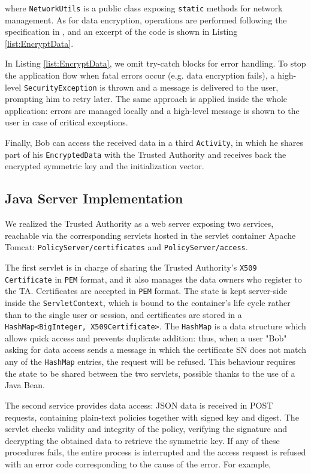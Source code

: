 \noindent where \texttt{NetworkUtils} is a public class exposing \texttt{static} methods for network management. As for data encryption, operations are performed following the specification in \cite{pearson2011sticky}, and an excerpt of the code is shown in Listing \ref{list:EncryptData}.


In Listing \ref{list:EncryptData}, we omit try-catch blocks for error handling. To stop the application flow when fatal errors occur (e.g. data encryption fails), a high-level \texttt{SecurityException} is thrown and a message is delivered to the user, prompting him to retry later. The same approach is applied inside the whole application: errors are managed locally and a high-level message is shown to the user in case of critical exceptions.

Finally, Bob can access the received data in a third \texttt{Activity}, in which he shares part of his \texttt{EncryptedData} with the Trusted Authority and receives back the encrypted symmetric key and the initialization vector.

\subsection{Java Server Implementation}
We realized the Trusted Authority as a web server exposing two services, reachable via the corresponding servlets hosted in the servlet container Apache Tomcat: \texttt{PolicyServer/certificates} and \texttt{PolicyServer/access}.

The first servlet is in charge of sharing the Trusted Authority's \texttt{X509 Certificate} in \texttt{PEM} format, and it also manages the data owners who register to the TA. Certificates are accepted in \texttt{PEM} format. The state is kept server-side inside the \texttt{ServletContext}, which is bound to the container's life cycle rather than to the single user or session, and certificates are stored in a \texttt{HashMap<BigInteger, X509Certificate>}. The \texttt{HashMap} is a data structure which allows quick access and prevents duplicate addition: thus, when a user "Bob" asking for data access sends a message in which the certificate SN does not match any of the \texttt{HashMap} entries, the request will be refused. This behaviour requires the state to be shared between the two servlets, possible thanks to the use of a Java Bean.

The second service provides data access: JSON data is received in POST requests, containing plain-text policies together with signed key and digest. The servlet checks validity and integrity of the policy, verifying the signature and decrypting the obtained data to retrieve the symmetric key. If any of these procedures fails, the entire process is interrupted and the access request is refused with an error code corresponding to the cause of the error. For example,


